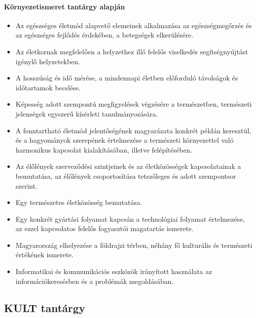 \paragraph{Környezetismeret tantárgy alapján}
\begin{itemize}
\item Az egészséges életmód alapvető elemeinek alkalmazása az egészségmegőrzés és az egészséges fejlődés érdekében, a betegségek elkerülésére.
\item Az életkornak megfelelően a helyzethez illő felelős viselkedés segítségnyújtást igénylő helyzetekben.
\item A hosszúság és idő mérése, a mindennapi életben előforduló távolságok és időtartamok becslése.
\item Képesség adott szempontú megfigyelések végzésére a természetben, természeti jelenségek egyszerű kísérleti tanulmányozására.
\item A fenntartható életmód jelentőségének magyarázata konkrét példán keresztül, és a hagyományok szerepének értelmezése a természeti környezettel való harmonikus kapcsolat kialakításában, illetve felépítésében.
\item Az élőlények szerveződési szintjeinek és az életközösségek kapcsolatainak a bemutatása, az élőlények csoportosítása tetszőleges és adott szempontsor szerint.
\item Egy természetes életközösség bemutatása.
\item Egy konkrét gyártási folyamat kapcsán a technológiai folyamat értelmezése, az ezzel kapcsolatos felelős fogyasztói magatartás ismerete.
\item Magyarország elhelyezése a földrajzi térben, néhány fő kulturális és természeti értékének ismerete.
\item Informatikai és kommunikációs eszközök irányított használata az információkeresésben és a problémák megoldásában.
\end{itemize}
\subsection{KULT tantárgy}
